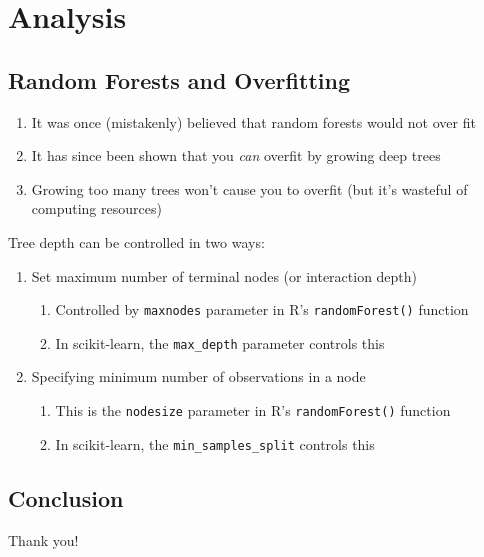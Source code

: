 \documentclass[pdf]{beamer}
\begin{document}
		





\section{Analysis}
	\subsection{Random Forests and Overfitting}
		\begin{frame}
			\begin{enumerate}
				\item It was once (mistakenly) believed that random forests would not over fit
				\item It has since been shown that you \textit{can} overfit by growing deep trees
				\item Growing too many trees won't cause you to overfit (but it's wasteful of computing resources)
			\end{enumerate}
		\end{frame}
		
		\begin{frame}
			Tree depth can be controlled in two ways:  
			\begin{enumerate}
				\item Set maximum number of terminal nodes (or interaction depth) 
					\begin{enumerate}[1]
						\item Controlled by \texttt{maxnodes} parameter in R's \texttt{randomForest()} function
						\item In scikit-learn, the \texttt{max_depth} parameter controls this
					\end{enumerate}
				\item Specifying minimum number of observations in a node 
					\begin{enumerate}[1]
						\item This is the \texttt{nodesize} parameter in R's \texttt{randomForest()} function
						\item In scikit-learn, the \texttt{min_samples_split} controls this
					\end{enumerate}
			\end{enumerate}
		\end{frame}
		
	\subsection{Conclusion}	
		\begin{frame}{\hspace{3 mm}}
			\begin{center}
			Thank you!
			\end{center}
		\end{frame} 
		
		
		
\end{document}
